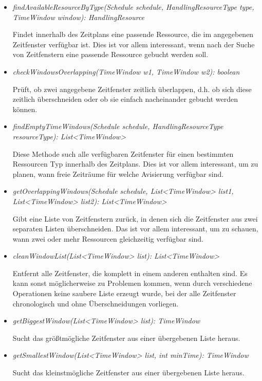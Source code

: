 \begin{itemize}
    \item \textit{findAvailableResourceByType(Schedule schedule, HandlingResourceType type, TimeWindow window): HandlingResource}

    Findet innerhalb des Zeitplans eine passende Ressource, die im angegebenen Zeitfenster verfügbar ist. Dies ist vor allem interessant, wenn nach der Suche von Zeitfenstern eine passende Ressource gebucht werden soll.    
    
    \item \textit {checkWindowsOverlapping(TimeWindow w1, TimeWindow w2): boolean}

    Prüft, ob zwei angegebene Zeitfenster zeitlich überlappen, d.h. ob sich diese zeitlich überschneiden oder ob sie einfach nacheinander gebucht werden können.
    
    \item \textit{findEmptyTimeWindows(Schedule schedule, HandlingResourceType resourceType): List\textless{}TimeWindow\textgreater{}}

    Diese Methode such alle verfügbaren Zeitfenster für einen bestimmten Ressourcen Typ innerhalb des Zeitplans. Dies ist vor allem interessant, um zu planen, wann freie Zeiträume für welche Avisierung verfügbar sind.
    
    \item \textit{getOverlappingWindows(Schedule schedule, List\textless{}TimeWindow\textgreater{} list1, List\textless{}TimeWindow\textgreater{} list2): List\textless{}TimeWindow\textgreater{}}

    Gibt eine Liste von Zeitfenstern zurück, in denen sich die Zeitfenster aus zwei separaten Listen überschneiden. Das ist vor allem interessant, um zu schauen, wann zwei oder mehr Ressourcen gleichzeitig verfügbar sind.
    
    \item \textit{cleanWindowList(List\textless{}TimeWindow\textgreater{} list): List\textless{}TimeWindow\textgreater{}}

    Entfernt alle Zeitfenster, die komplett in einem anderen enthalten sind. Es kann sonst möglicherweise zu Problemen kommen, wenn durch verschiedene Operationen keine saubere Liste erzeugt wurde, bei der alle Zeitfenster chronologisch und ohne Überschneidungen vorliegen.
    
    \item \textit{getBiggestWindow(List\textless{}TimeWindow\textgreater{} list): TimeWindow}

    Sucht das größtmögliche Zeitfenster aus einer übergebenen Liste heraus.
    
    \item \textit{getSmallestWindow(List\textless{}TimeWindow\textgreater{} list, int minTime): TimeWindow}

    Sucht das kleinstmögliche Zeitfenster aus einer übergebenen Liste heraus.
\end{itemize}

